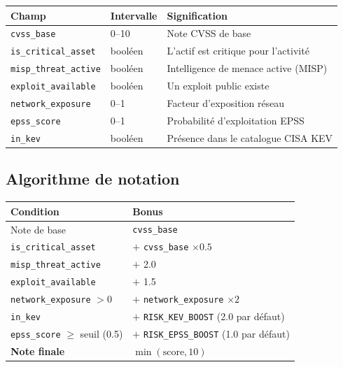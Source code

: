 \begin{center}
\small
\begin{tabularx}{\linewidth}{@{}l l X@{}}
\toprule
\textbf{Champ} & \textbf{Intervalle} & \textbf{Signification} \\
\midrule
\texttt{cvss\_base} & 0--10 & Note CVSS de base \\
\texttt{is\_critical\_asset} & bool\'een & L'actif est critique pour l'activit\'e \\
\texttt{misp\_threat\_active} & bool\'een & Intelligence de menace active (MISP) \\
\texttt{exploit\_available} & bool\'een & Un exploit public existe \\
\texttt{network\_exposure} & 0--1 & Facteur d'exposition r\'eseau \\
\texttt{epss\_score} & 0--1 & Probabilit\'e d'exploitation EPSS \\
\texttt{in\_kev} & bool\'een & Pr\'esence dans le catalogue CISA KEV \\
\bottomrule
\end{tabularx}
\end{center}

\subsection{Algorithme de notation}

\begin{center}
\small
\begin{tabularx}{\linewidth}{@{}X l@{}}
\toprule
\textbf{Condition} & \textbf{Bonus} \\
\midrule
Note de base & \texttt{cvss\_base} \\
\texttt{is\_critical\_asset} & $+$ \texttt{cvss\_base} $\times 0.5$ \\
\texttt{misp\_threat\_active} & $+$ 2.0 \\
\texttt{exploit\_available} & $+$ 1.5 \\
\texttt{network\_exposure} $> 0$ & $+$ \texttt{network\_exposure} $\times 2$ \\
\texttt{in\_kev} & $+$ \texttt{RISK\_KEV\_BOOST} (2.0 par d\'efaut) \\
\texttt{epss\_score} $\geq$ seuil (0.5) & $+$ \texttt{RISK\_EPSS\_BOOST} (1.0 par d\'efaut) \\
\midrule
\textbf{Note finale} & $\min(\text{score}, 10)$ \\
\bottomrule
\end{tabularx}
\end{center}


